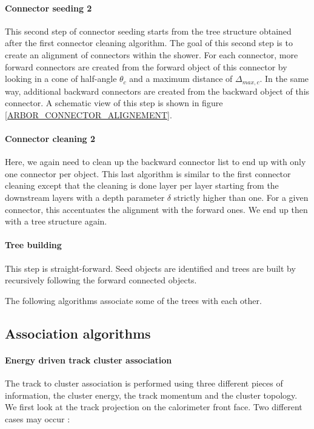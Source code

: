 \documentclass[cits]{JINST}
\begin{document}
\paragraph*{Connector seeding 2} This second step of connector seeding starts from the tree structure obtained after the first connector cleaning algorithm. The goal of this second step is to create an alignment of connectors within the shower. For each connector, more forward connectors are created from the forward object of this connector by looking in a cone of half-angle $\theta_c$ and a maximum distance of $\Delta_{max,c}$. In the same way, additional backward connectors are created from the backward object of this connector. A schematic view of this step is shown in figure \ref{ARBOR_CONNECTOR_ALIGNEMENT}.

\paragraph*{Connector cleaning 2} Here, we again need to clean up the backward connector list to end up with only one connector per object. This last algorithm is similar to the first connector cleaning except that the cleaning is done layer per layer starting from the downstream layers with a depth parameter $\delta$ strictly higher than one. For a given connector, this accentuates the alignment with the forward ones. We end up then with a tree structure again.

\paragraph*{Tree building} This step is straight-forward. Seed objects are identified and trees are built by recursively following the forward connected objects.

The following algorithms associate some of the trees with each other.

\subsection*{Association algorithms}

\paragraph*{Energy driven track cluster association} The track to cluster association is performed using three different pieces of information, the cluster energy, the track momentum and the cluster topology. We first look at the track projection on the calorimeter front face. Two different cases may occur :
\end{document}
